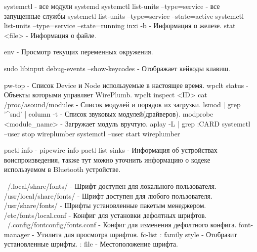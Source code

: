 systemctl - все модули systemd 
systemctl list-units --type=service - все запущенные службы
systemctl list-units --type=service --state=active
systemctl list-units --type=service --state=running
inxi -b - Информация о железе.
stat <file> - Информация о файле.

env - Просмотр текущих переменных окружения.

sudo libinput debug-events --show-keycodes - Отображает кейкоды клавиш.


pw-top - Список Device и Node используемые в настоящее время.
wpclt status - Объекты которыми управляет WirePlumb.
wpclt inspect <ID>
cat /proc/asound/modules - Список модулей и порядок их загрузки.
lsmod | grep '^snd' | column -t - Список звуковых модулей(драйверов).
modprobe <module_name> - Загружает модуль вручтую.
aplay -L | grep :CARD
systemctl --user stop wireplumber
systemctl --user start wireplumber

pactl info - pipewire info
pactl list sinks - Информация об устройствах воиспроизведения, также тут можно
    уточнить информацию о кодеке используемом в Bluetooth устройстве.

~/.local/share/fonts/   - Шрифт доступен для локального пользователя.
/usr/local/share/fonts/ - Шрифт доступен для любого пользователя.
/usr/share/fonts/       - Шрифты установленные пакетым менеджером.
/etc/fonts/local.conf   - Конфиг для установки дефолтных шрифтов.
~/.config/fontconfig/fonts.conf - Конфиг для изменения дефолтного конфига.
font-manager            - Утилита для просмотра шрифтов.
fc-list : family style  - Отобразит установленные шрифты.
        : file          - Местоположение шрифта.

